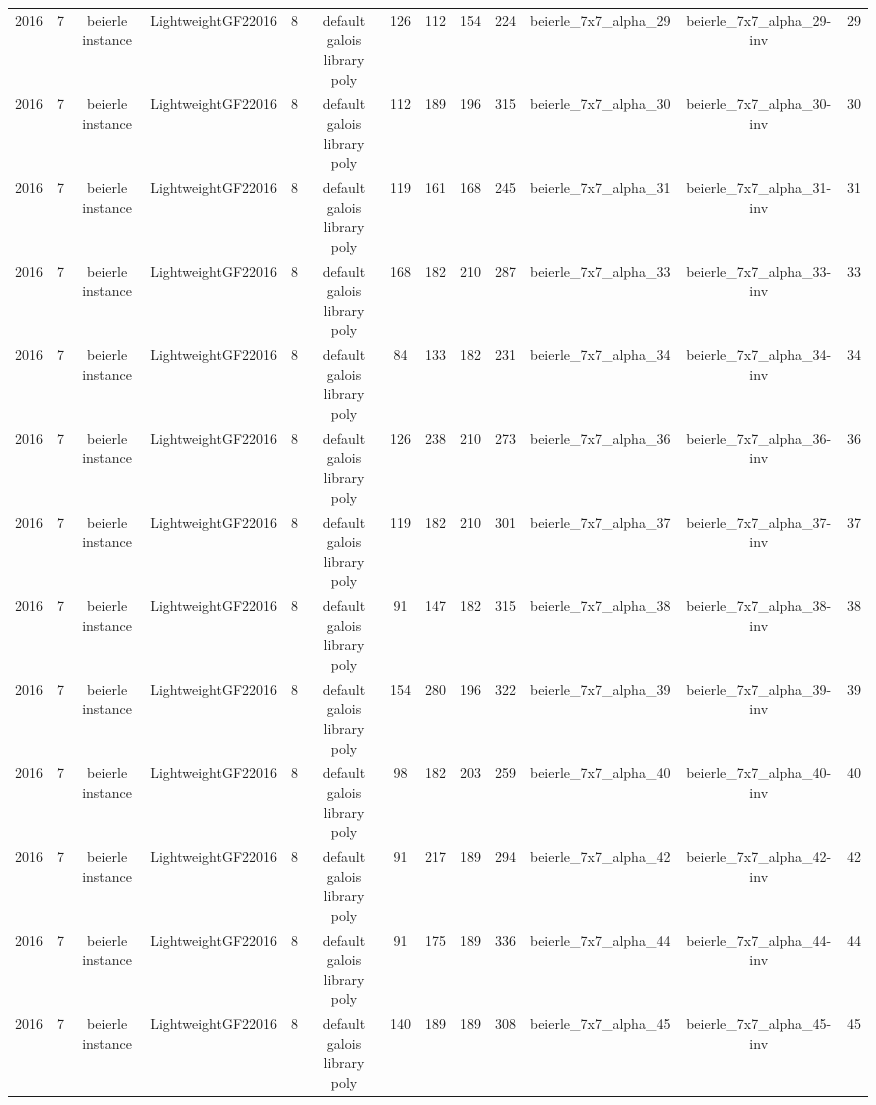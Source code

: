 \begin{tabular}{c c c c c c c c c c c c c}
2016 & 7 & beierle instance & LightweightGF22016 & 8 & default galois library poly & 126 & 112 & 154 & 224 & beierle_7x7_alpha_29 & beierle_7x7_alpha_29-inv & 29 \\
2016 & 7 & beierle instance & LightweightGF22016 & 8 & default galois library poly & 112 & 189 & 196 & 315 & beierle_7x7_alpha_30 & beierle_7x7_alpha_30-inv & 30 \\
2016 & 7 & beierle instance & LightweightGF22016 & 8 & default galois library poly & 119 & 161 & 168 & 245 & beierle_7x7_alpha_31 & beierle_7x7_alpha_31-inv & 31 \\
2016 & 7 & beierle instance & LightweightGF22016 & 8 & default galois library poly & 168 & 182 & 210 & 287 & beierle_7x7_alpha_33 & beierle_7x7_alpha_33-inv & 33 \\
2016 & 7 & beierle instance & LightweightGF22016 & 8 & default galois library poly & 84 & 133 & 182 & 231 & beierle_7x7_alpha_34 & beierle_7x7_alpha_34-inv & 34 \\
2016 & 7 & beierle instance & LightweightGF22016 & 8 & default galois library poly & 126 & 238 & 210 & 273 & beierle_7x7_alpha_36 & beierle_7x7_alpha_36-inv & 36 \\
2016 & 7 & beierle instance & LightweightGF22016 & 8 & default galois library poly & 119 & 182 & 210 & 301 & beierle_7x7_alpha_37 & beierle_7x7_alpha_37-inv & 37 \\
2016 & 7 & beierle instance & LightweightGF22016 & 8 & default galois library poly & 91 & 147 & 182 & 315 & beierle_7x7_alpha_38 & beierle_7x7_alpha_38-inv & 38 \\
2016 & 7 & beierle instance & LightweightGF22016 & 8 & default galois library poly & 154 & 280 & 196 & 322 & beierle_7x7_alpha_39 & beierle_7x7_alpha_39-inv & 39 \\
2016 & 7 & beierle instance & LightweightGF22016 & 8 & default galois library poly & 98 & 182 & 203 & 259 & beierle_7x7_alpha_40 & beierle_7x7_alpha_40-inv & 40 \\
2016 & 7 & beierle instance & LightweightGF22016 & 8 & default galois library poly & 91 & 217 & 189 & 294 & beierle_7x7_alpha_42 & beierle_7x7_alpha_42-inv & 42 \\
2016 & 7 & beierle instance & LightweightGF22016 & 8 & default galois library poly & 91 & 175 & 189 & 336 & beierle_7x7_alpha_44 & beierle_7x7_alpha_44-inv & 44 \\
2016 & 7 & beierle instance & LightweightGF22016 & 8 & default galois library poly & 140 & 189 & 189 & 308 & beierle_7x7_alpha_45 & beierle_7x7_alpha_45-inv & 45 \\

\end{tabular}

